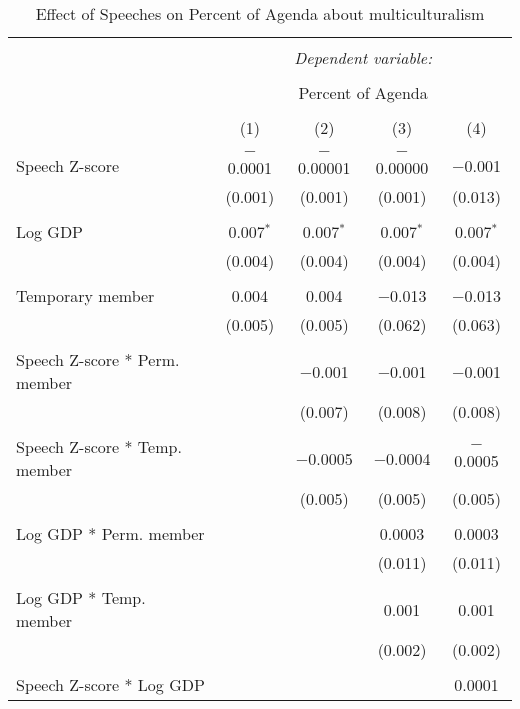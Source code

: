 
\begin{table}[!htbp] \centering 
  \caption{Effect of Speeches on Percent of Agenda about multiculturalism} 
  \label{} 
\begin{tabular}{@{\extracolsep{5pt}}lcccc} 
\\[-1.8ex]\hline 
\hline \\[-1.8ex] 
 & \multicolumn{4}{c}{\textit{Dependent variable:}} \\ 
\cline{2-5} 
\\[-1.8ex] & \multicolumn{4}{c}{Percent of Agenda} \\ 
\\[-1.8ex] & (1) & (2) & (3) & (4)\\ 
\hline \\[-1.8ex] 
 Speech Z-score & $-$0.0001 & $-$0.00001 & $-$0.00000 & $-$0.001 \\ 
  & (0.001) & (0.001) & (0.001) & (0.013) \\ 
  & & & & \\ 
 Log GDP & 0.007$^{*}$ & 0.007$^{*}$ & 0.007$^{*}$ & 0.007$^{*}$ \\ 
  & (0.004) & (0.004) & (0.004) & (0.004) \\ 
  & & & & \\ 
 Temporary member & 0.004 & 0.004 & $-$0.013 & $-$0.013 \\ 
  & (0.005) & (0.005) & (0.062) & (0.063) \\ 
  & & & & \\ 
 Speech Z-score * Perm. member &  & $-$0.001 & $-$0.001 & $-$0.001 \\ 
  &  & (0.007) & (0.008) & (0.008) \\ 
  & & & & \\ 
 Speech Z-score * Temp. member &  & $-$0.0005 & $-$0.0004 & $-$0.0005 \\ 
  &  & (0.005) & (0.005) & (0.005) \\ 
  & & & & \\ 
 Log GDP * Perm. member &  &  & 0.0003 & 0.0003 \\ 
  &  &  & (0.011) & (0.011) \\ 
  & & & & \\ 
 Log GDP * Temp. member &  &  & 0.001 & 0.001 \\ 
  &  &  & (0.002) & (0.002) \\ 
  & & & & \\ 
 Speech Z-score * Log GDP &  &  &  & 0.0001 \\ 

\end{tabular}
\end{table}
